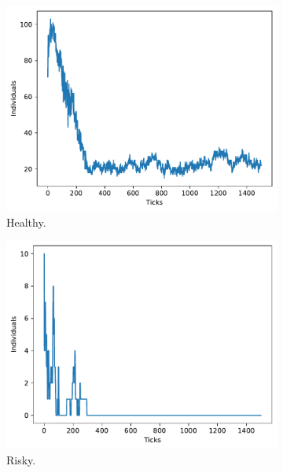     \begin{figure}
        \centering
        \begin{subfigure}[b]{0.3\columnwidth}
            \centering
            \includegraphics[width=1\columnwidth]{files/results-healthy.pdf}
            \caption{Healthy.}
            \label{subfig:control}
        \end{subfigure} 
        \begin{subfigure}[b]{0.3\columnwidth}
            \centering 
            \includegraphics[width=1\columnwidth]{files/results-risk.pdf}
            \caption{Risky.}
            \label{subfig:sol}
        \end{subfigure}
        \begin{subfigure}[b]{0.3\columnwidth}

\end{subfigure}
\end{figure}
